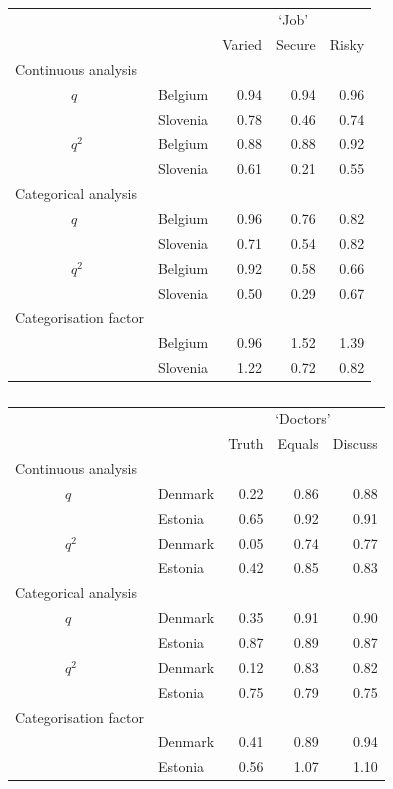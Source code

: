 \documentclass[a4paper,12pt]{article}
\begin{document}
\begin{table}\centering\caption{\label{tab:job}}\begin{tabular}{lllrrr}
\hline
  &    & & \multicolumn{3}{c}{`Job'} \\
 &      &   & Varied & Secure & Risky\\
\hline
\multicolumn{2}{l}{Continuous analysis    } &  &  &  & \\
 &   $q$ & Belgium & 0.94 & 0.94 & 0.96\\
 &    & Slovenia & 0.78 & 0.46 & 0.74\\
 &   $q^2$ & Belgium & 0.88 & 0.88 & 0.92\\
 &    & Slovenia & 0.61 & 0.21 & 0.55\\
\multicolumn{2}{l}{Categorical analysis  }   &  &  &  & \\
 &   $q$ & Belgium & 0.96 & 0.76 & 0.82\\
 &    & Slovenia & 0.71 & 0.54 & 0.82\\
 &   $q^2$ & Belgium & 0.92 & 0.58 & 0.66\\
 &    & Slovenia & 0.50 & 0.29 & 0.67\\
\multicolumn{2}{l}{Categorisation factor}     &  &  &  & \\
 &    & Belgium & 0.96 & 1.52 & 1.39\\
 &     & Slovenia & 1.22 & 0.72 & 0.82\\
\hline
\end{tabular}\end{table}

\begin{table}\centering\caption{\label{tab:doctors}}\begin{tabular}{lllrrr}

\hline
&&&\multicolumn{3}{c}{`Doctors'}\\
 &  &  & Truth & Equals & Discuss\\
\hline
\multicolumn{2}{l}{Continuous analysis   }&  &  &  & \\
 & $q$ & Denmark & 0.22 & 0.86 & 0.88\\
 &  & Estonia & 0.65 & 0.92 & 0.91\\
 & $q^2$ & Denmark & 0.05 & 0.74 & 0.77\\
 &  & Estonia & 0.42 & 0.85 & 0.83\\
\multicolumn{2}{l}{Categorical analysis  } &  &  &  & \\
 & $q$ & Denmark & 0.35 & 0.91 & 0.90\\
 &  & Estonia & 0.87 & 0.89 & 0.87\\
 & $q^2$ & Denmark & 0.12 & 0.83 & 0.82\\
 &  & Estonia & 0.75 & 0.79 & 0.75\\
\multicolumn{2}{l}{Categorisation factor}   &  &  &  & \\
 &  & Denmark & 0.41 & 0.89 & 0.94\\
 &  & Estonia & 0.56 & 1.07 & 1.10\\
\hline
\end{tabular}\end{table}
\end{document}

